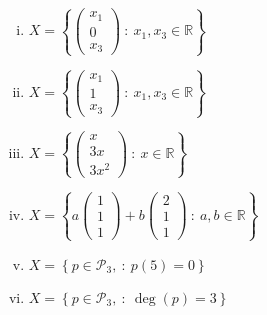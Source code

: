 	\begin{enumerate}[(i)]
		\item $\displaystyle X = \left\{  \begin{pmatrix}x_1\\0\\x_3\end{pmatrix}\ :\ x_1,x_3\in\mathbb{R}  \right\}$
		
		\item $\displaystyle X = \left\{  \begin{pmatrix}x_1\\1\\x_3\end{pmatrix}\ :\ x_1,x_3\in\mathbb{R}  \right\}$
		
		\item $\displaystyle X = \left\{  \begin{pmatrix}x\\3x\\3x^2\end{pmatrix}\ :\ x\in\mathbb{R}  \right\}$
		
		\item $\displaystyle 
		X = \left\{  a\begin{pmatrix}1\\1\\1\end{pmatrix} + b\begin{pmatrix}2\\1\\1\end{pmatrix}\ :\ a,b\in\mathbb{R}   \right\}$
		
		\item $\displaystyle X = \left\{  p\in \mathcal{P}_3,\ :\ p(5)=0  \right \}$
		
		\item $\displaystyle X = \left\{  p\in \mathcal{P}_3,\ :\ \deg(p)=3  \right \}$
		
	\end{enumerate}
\renewcommand\qedsymbol{}
